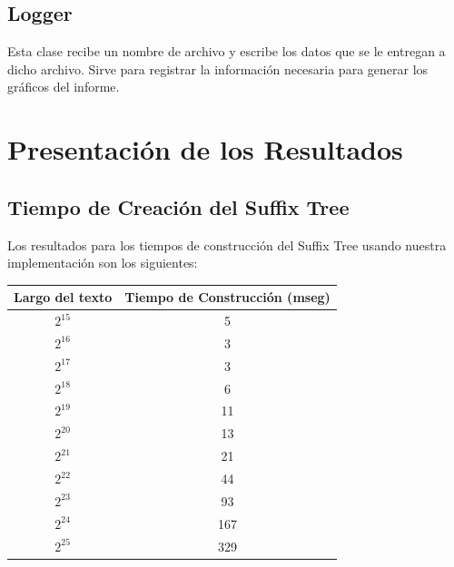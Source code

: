 \documentclass[letterpaper,10pt]{article}
\begin{document}
	\subsection{Logger}

	Esta clase recibe un nombre de archivo y escribe los datos que se le entregan a dicho archivo. Sirve para registrar la información necesaria para generar los gráficos del informe.

	\newpage

	\section{Presentación de los Resultados}

	\subsection{Tiempo de Creación del Suffix Tree}

	Los resultados para los tiempos de construcción del Suffix Tree usando nuestra implementación son los siguientes:

	\begin{center}
		\begin{tabular}{|c|c|}
			\hline
			Largo del texto & Tiempo de Construcción (mseg)\\
			\hline
			$2^{15}$ & 5\\
			\hline
			$2^{16}$ & 3\\
			\hline
			$2^{17}$ & 3\\
			\hline
			$2^{18}$ & 6\\
			\hline
			$2^{19}$ & 11\\
			\hline
			$2^{20}$ & 13\\
			\hline
			$2^{21}$ & 21\\
			\hline
			$2^{22}$ & 44\\
			\hline
			$2^{23}$ & 93\\
			\hline
			$2^{24}$ & 167\\
			\hline
			$2^{25}$ & 329\\
			\hline
		\end{tabular}
	\end{center}
\end{document}
